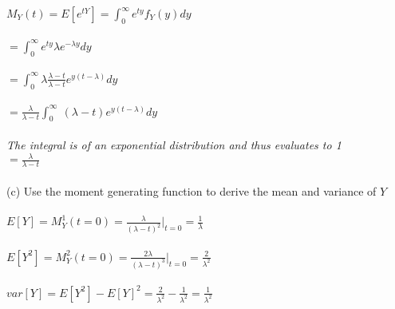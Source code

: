 \documentclass{article}
\begin{document}
\begin{itemize}
    $M_Y(t)=E[e^{tY}]=\int_0^\infty e^{ty}f_Y(y)dy$\\\\
    $=\int_0^\infty e^{ty}\lambda e^{-\lambda y}dy$\\\\
    $=\int_0^\infty\lambda\frac{\lambda-t}{\lambda-t}e^{y(t-\lambda)}dy$\\\\
    $=\frac{\lambda}{\lambda-t}\int_0^\infty\ (\lambda-t)e^{y(t-\lambda)}dy$\\\\
    \emph{The integral is of an exponential distribution and thus evaluates to 1}\\
    $=\frac{\lambda}{\lambda-t}$\\\\
    (c) Use the moment generating function to derive the mean and variance of $Y$\\\\
    $E[Y]=M_Y^1(t=0)=\frac{\lambda}{(\lambda-t)^2}|_{t=0}=\frac{1}{\lambda}$\\\\
    $E[Y^2]=M_Y^2(t=0)=\frac{2\lambda}{(\lambda-t)^3}|_{t=0}=\frac{2}{\lambda^2}$\\\\
    $var[Y]=E[Y^2]-E[Y]^2=\frac{2}{\lambda^2}-\frac{1}{\lambda^2}=\frac{1}{\lambda^2}$\\\\
\end{itemize}
\pagebreak
\end{document}
